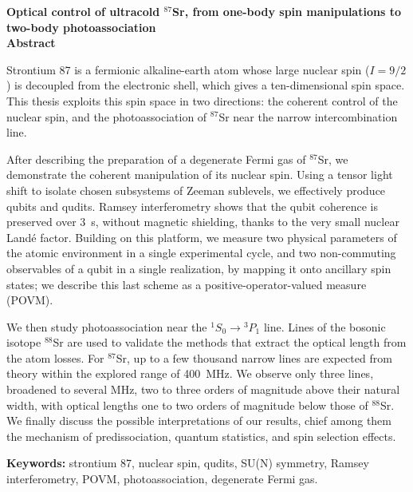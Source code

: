 \clearpage
\ifodd\value{page}\hbox{}\thispagestyle{empty}\clearpage\fi
\thispagestyle{empty}
\enlargethispage{3\baselineskip}
\vspace*{-1.2cm}
\begin{center}
    {\large \textbf{Optical control of ultracold $^{87}$Sr, from one-body spin manipulations to two-body photoassociation}}\\[0.4cm]
    {\large \textbf{Abstract}}\\[-0.3cm]
\end{center}

{\footnotesize
Strontium 87 is a fermionic alkaline-earth atom whose large nuclear spin ($I=9/2$) is
decoupled from the electronic shell, which gives a ten-dimensional spin
space. This thesis exploits this spin space in two directions: the coherent control of the
nuclear spin, and the photoassociation of $^{87}$Sr near the narrow intercombination line.

After describing the preparation of a degenerate Fermi gas of $^{87}$Sr, we demonstrate the
coherent manipulation of its nuclear spin. Using a tensor light shift to isolate chosen
subsystems of Zeeman sublevels, we effectively produce qubits and qudits. Ramsey
interferometry shows that the qubit coherence is preserved over $3$~s, without magnetic shielding, thanks to
the very small nuclear Land\'e factor. Building on this platform, we measure two physical
parameters of the atomic environment in a single experimental cycle, and two non-commuting observables of a qubit in a
single realization, by mapping it onto ancillary spin states; we describe this last scheme as a
positive-operator-valued measure (POVM).

We then study photoassociation near the $^1S_0\rightarrow{}^3P_1$ line. Lines of the bosonic
isotope $^{88}$Sr are used to validate the methods that extract the optical length from the
atom losses. For $^{87}$Sr, up to a few
thousand narrow lines are expected from theory within the explored range of 400~MHz. We observe only three lines,
broadened to several MHz, two to three orders of magnitude above their natural width, with
optical lengths one to two orders of magnitude below those of $^{88}$Sr. We finally discuss the possible 
interpretations of our results, chief among them the mechanism of predissociation, quantum statistics, and spin selection effects.

\vspace{0.15cm}
\noindent\textbf{Keywords:} strontium 87, nuclear spin, qudits, SU(N) symmetry, Ramsey interferometry, POVM, photoassociation, degenerate Fermi gas.
\par}


